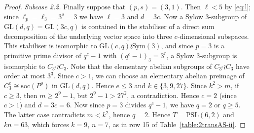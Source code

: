 \documentclass[12pt]{amsart}
\theoremstyle{remark}
\theoremstyle{definition}
\newcommand{\soc}{\mathrm{soc}}
\newcommand{\PSL}{\mathrm{PSL}}
\newcommand{\sym}{\mathrm{Sym}}
\newcommand{\GL}{\mathrm{GL}}
\begin{document}
\begin{proof}

\emph{Subcase 2.2.} Finally suppose that $(p,s) = (3, 1)$. Then  $\ell < 5$ by \eqref{eq:l}; since $\ell_p = \ell_3 = 3^s = 3$ we have $\ell = 3$ and $d=3c$.  Now a Sylow 3-subgroup of $\GL(d,q)=\GL(3c,q)$ is contained in   the stabiliser of a direct sum decomposition of the underlying vector space into three $c$-dimensional subspaces. This stabiliser is isomorphic to $\GL(c,q) \wr \sym(3)$, and since $p=3$ is a primitive prime divisor of $q^c-1$ with $(q^c-1)_3=3^r$, a Sylow $3$-subgroup is isomorphic to $C_{3^r} \wr C_3$. Note that the elementary abelian subgroups of $C_{3^r} \wr C_3$ have order at most $3^3$. Since $c>1$, we can choose an elementary abelian preimage of $C_3^e \cong \soc(P^\rho)$ in $\GL(d,q)$. Hence $e \leqslant 3$ and $k\in \{3,9,27\}$.  Since $k^2>m$, if $c\geqslant 3$, then  $m \geqslant 2^9-1$, but $2^9-1 > 27^2$, a contradiction. Hence $c=2$ (since $c>1$) and  $d=3c=6$. Now since $p=3$ divides $q^c-1$, we have $q=2$ or $q \geqslant 5$. The latter case contradicts $m < k^2$, hence $q=2$. Hence $T=\PSL(6,2)$ and $kn=63$, which forces  $k = 9$, $n = 7$, as in row 15 of Table~\ref{table:2transAS-ii}.
\end{proof}
\end{document}
